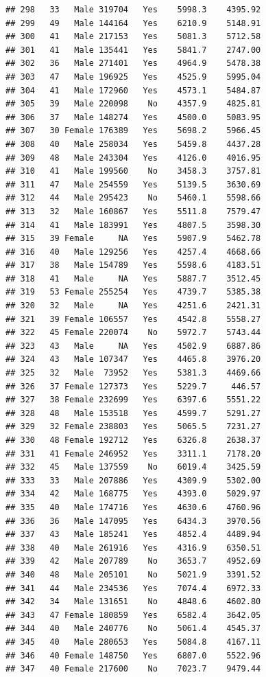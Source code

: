 \documentclass[12pt,]{krantz}
\theoremstyle{definition}
\theoremstyle{definition}
\theoremstyle{remark}
\begin{document}
\begin{verbatim}
## 298   33   Male 319704   Yes    5998.3    4395.92
## 299   49   Male 144164   Yes    6210.9    5148.91
## 300   41   Male 217153   Yes    5081.3    5712.58
## 301   41   Male 135441   Yes    5841.7    2747.00
## 302   36   Male 271401   Yes    4964.9    5478.38
## 303   47   Male 196925   Yes    4525.9    5995.04
## 304   41   Male 172960   Yes    4573.1    5484.87
## 305   39   Male 220098    No    4357.9    4825.81
## 306   37   Male 148274   Yes    4500.0    5083.95
## 307   30 Female 176389   Yes    5698.2    5966.45
## 308   40   Male 258034   Yes    5459.8    4437.28
## 309   48   Male 243304   Yes    4126.0    4016.95
## 310   41   Male 199560    No    3458.3    3757.81
## 311   47   Male 254559   Yes    5139.5    3630.69
## 312   44   Male 295423    No    5460.1    5598.66
## 313   32   Male 160867   Yes    5511.8    7579.47
## 314   41   Male 183991   Yes    4807.5    3598.30
## 315   39 Female     NA   Yes    5907.9    5462.78
## 316   40   Male 129256   Yes    4257.4    4668.66
## 317   38   Male 154789   Yes    5598.6    4183.51
## 318   41   Male     NA   Yes    5887.7    3512.45
## 319   53 Female 255254   Yes    4739.7    5385.38
## 320   32   Male     NA   Yes    4251.6    2421.31
## 321   39 Female 106557   Yes    4542.8    5558.27
## 322   45 Female 220074    No    5972.7    5743.44
## 323   43   Male     NA   Yes    4502.9    6887.86
## 324   43   Male 107347   Yes    4465.8    3976.20
## 325   32   Male  73952   Yes    5381.3    4469.66
## 326   37 Female 127373   Yes    5229.7     446.57
## 327   38 Female 232699   Yes    6397.6    5551.22
## 328   48   Male 153518   Yes    4599.7    5291.27
## 329   32 Female 238803   Yes    5065.5    7231.27
## 330   48 Female 192712   Yes    6326.8    2638.37
## 331   41 Female 246952   Yes    3311.1    7178.20
## 332   45   Male 137559    No    6019.4    3425.59
## 333   33   Male 207886   Yes    4309.9    5302.00
## 334   42   Male 168775   Yes    4393.0    5029.97
## 335   40   Male 174716   Yes    4630.6    4760.96
## 336   36   Male 147095   Yes    6434.3    3970.56
## 337   43   Male 185241   Yes    4852.4    4489.94
## 338   40   Male 261916   Yes    4316.9    6350.51
## 339   42   Male 207789    No    3653.7    4952.69
## 340   48   Male 205101    No    5021.9    3391.52
## 341   44   Male 234536   Yes    7074.4    6972.33
## 342   34   Male 131651    No    4848.6    4602.80
## 343   47 Female 180859   Yes    6582.4    3642.05
## 344   40   Male 240776    No    5061.4    4545.37
## 345   40   Male 280653   Yes    5084.8    4167.11
## 346   40 Female 148750   Yes    6807.0    5522.96
## 347   40 Female 217600    No    7023.7    9479.44

\end{verbatim}
\end{document}
